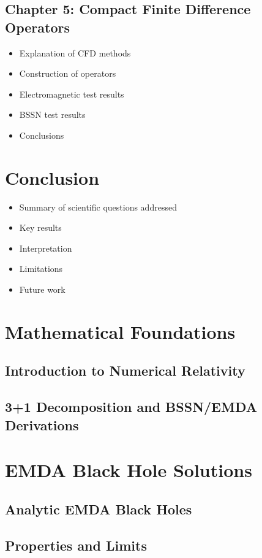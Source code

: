 \documentclass[12pt]{article}
\begin{document}
\subsection{Chapter 5: Compact Finite Difference Operators}
\begin{itemize}
    \item Explanation of CFD methods
    \item Construction of operators
    \item Electromagnetic test results
    \item BSSN test results
    \item Conclusions
\end{itemize}

\section{Conclusion}
\begin{itemize}
    \item Summary of scientific questions addressed
    \item Key results
    \item Interpretation
    \item Limitations
    \item Future work
\end{itemize}

\appendix

\section{Mathematical Foundations}
\subsection{Introduction to Numerical Relativity}
\subsection{3+1 Decomposition and BSSN/EMDA Derivations}

\section{EMDA Black Hole Solutions}
\subsection{Analytic EMDA Black Holes}
\subsection{Properties and Limits}
\end{document}
